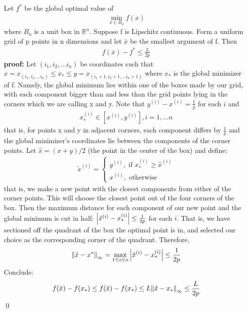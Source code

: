 \documentclass[12pt,a4paper]{article}
\begin{document}
	
	Let $f^*$ be the global optimal value of
	\begin{align*}
		\min_{x \in B_n}f(x)
	\end{align*}
	where $B_n$ is a unit box in $\mathbb{R}^n$. Suppose f is Lipschitz continuous. Form a uniform grid of p points in n dimensions and let $\bar{x}$ be the smallest argument of f. Then 
	\begin{align*}
		f(\bar{x}) - f^* \leq \frac{L}{2p}
	\end{align*}
	\textbf{proof:} Let $(i_1, i_2, \ldots i_n)$ be coordinates such that $x = x_{(i_1, i_2, \ldots i_n)} \leq x_* \leq  y=x_{(i_1+1, i_2+1, \ldots i_n+1)}$ where $x_*$ is the global minimizer of f. Namely, the global minimum lies within one of the boxes made by our grid, with each component bigger than and less than the grid points lying in the corners which we are calling x and y.
	Note that $y^{(i)} - x^{(i)} = \frac{1}{p}$ for each $i$ and
	\begin{align*}
		x_*^{(i)} \in [x^{(i)},y^{(i)}], i=1, \ldots n
	\end{align*}
	that is, for points x and y in adjacent corners, each component differs by $\frac{1}{p}$ and the global minimizer's coordinates lie between the components of the corner points. 
	Let $\hat{x} = (x+y)/2$ (the point in the center of the box) and define:
	\begin{align*} \tilde{x}^{(i)} = 
		\begin{cases}
			y^{(i)}, \text{ if } x_*^{(i)} \geq \hat{x}^{(i)} \\
			x^{(i)}, \text{ otherwise}
		\end{cases}
	\end{align*}
	that is, we make a new point with the closest components from either of the corner points. This will choose the closest point out of the four corners of the box. Then the maximum distance for each component of our new point and the global minimum is cut in half: $\abs{\tilde{x}^{(i)} - x_*^{(i)}} \leq \frac{1}{2p}$ for each $i$. 
	That is, we have sectioned off the quadrant of the box the optimal point is in, and selected our choice as the corresponding corner of the quadrant.
	Therefore,
	\begin{align*}
		\norm{\tilde{x} - x^*}_\infty = \max_{1 \leq i \leq n} \abs{\tilde{x}^{(i)} - x_*^{(i)}} \leq \frac{1}{2p}
	\end{align*}
	Conclude:
	\begin{align*}
		f(\bar{x}) - f(x_*) \leq f(\tilde{x}) - f(x_*) \leq L \norm{\tilde{x} - x_*}_\infty \leq \frac{L}{2p}
	\end{align*}
	\qed
	
\end{document}
